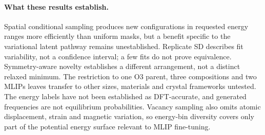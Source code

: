 \documentclass{article}
\begin{document}
\paragraph{What these results establish.}
Spatial conditional sampling produces new configurations in requested energy
ranges more efficiently than uniform masks, but a benefit specific to the
variational latent pathway remains unestablished. Replicate SD describes fit
variability, not a confidence interval; a few fits do not prove equivalence.
Symmetry-aware novelty establishes a different arrangement, not a distinct
relaxed minimum. The restriction to one O3 parent, three compositions and two
MLIPs leaves transfer to other sizes, materials and crystal frameworks untested.
The energy labels have not been established as DFT-accurate, and generated
frequencies are not equilibrium probabilities. Vacancy sampling also omits
atomic displacement, strain and magnetic variation, so energy-bin diversity
covers only part of the potential energy surface relevant to MLIP fine-tuning.
\clearpage


\end{document}
